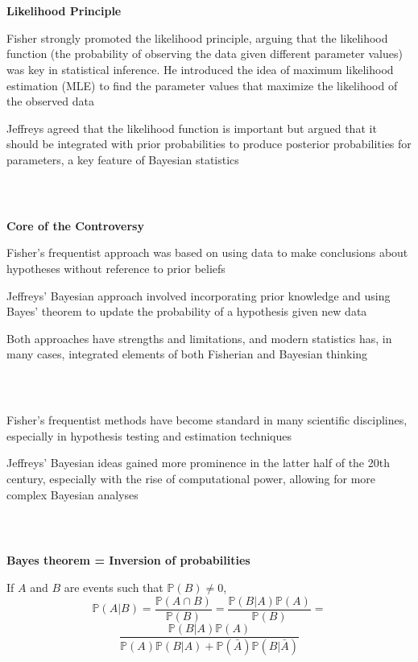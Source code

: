\documentclass[notes,professionalfont,11pt,usenames,dvipsnames]{beamer}
\newcommand{\vs}{\bigskip}
\renewcommand{\P}{\mathbb{P}}
\newcommand\justify{\rightskip0pt \leftskip0pt}
\newenvironment{slide}
{\begin{frame}[environment=slide]
\frametitle{\insertsection \\ \insertsubsection}\justify\setlength{\parskip}{0.5cm}\vspace{-1cm}}
{\end{frame}}
\begin{document}
\begin{slide}

{\color{red} \bf Likelihood Principle}

Fisher strongly promoted the likelihood principle, arguing that the likelihood function (the probability of observing the data given different parameter values) was key in statistical inference. He introduced the idea of maximum likelihood estimation (MLE) to find the parameter values that maximize the likelihood of the observed data

\vs Jeffreys agreed that the likelihood function is important but argued that it should be integrated with prior probabilities to produce posterior probabilities for parameters, a key feature of Baye\-sian statistics

\end{slide}

\begin{slide}

{\color{red} \bf Core of the Controversy}

Fisher's frequentist approach was based on using data to make conclusions about hypotheses without reference to prior beliefs

Jeffreys' Bayesian approach involved incorporating prior knowledge and using Bayes' theorem to update the probability of a hypothesis given new data

{\color{red} Both approaches have strengths and limitations, and modern statistics has, in many cases, integrated elements of both Fisherian and Bayesian thinking}

\end{slide}

\begin{slide}

Fisher's frequentist methods have become standard in many scientific disciplines, especially in hypothesis testing and estimation techniques

Jeffreys' Bayesian ideas gained more prominence in the latter half of the 20th century, especially with the rise of computational power, allowing for more complex Bayesian analyses

\end{slide}

\begin{slide}

\begin{center} 
\bf Bayes theorem = Inversion of probabilities 
\end{center}

If $A$ and $B$ are events such that $\P(B)\neq 0$,
$$
\P(A|B)=\frac{\P(A\cap B)}{\P(B)}=\frac{\P(B|A)\P(A)}{\P(B)}
=
$$
$$
\frac{\P(B|A)\P(A)}{\P(A)\P(B|A)+\P(\bar A)\P(B|\bar A)}
$$

\end{slide}
\end{document}
